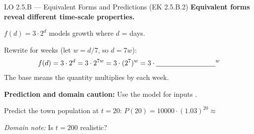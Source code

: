 \documentclass[10pt]{article}
\begin{document}
\vspace{0.06in}

\begin{notesbox}{LO 2.5.B --- Equivalent Forms and Predictions (EK 2.5.B.2)}
\textbf{Equivalent forms reveal different time-scale properties.}

$f(d) = 3 \cdot 2^d$ models growth where $d$ = days.

Rewrite for weeks (let $w = d/7$, so $d = 7w$):
\[
  f(d) = 3 \cdot 2^d = 3 \cdot 2^{7w} = 3 \cdot (2^7)^w = 3 \cdot \blank{3cm}^w
\]
The base \blank{3cm} means the quantity multiplies by \blank{4cm} each week.

\medskip
\textbf{Prediction and domain caution:} Use the model for inputs \blank{5cm}.

Predict the town population at $t = 20$: $P(20) = 10000 \cdot (1.03)^{20} \approx $ \blank{3cm}

\textit{Domain note:} Is $t = 200$ realistic? \blank{5cm}
\end{notesbox}
\end{document}
